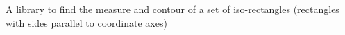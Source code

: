 \label{index_md_src_Readme}%
%
 A library to find the measure and contour of a set of iso-\/rectangles (rectangles with sides parallel to coordinate axes) 
